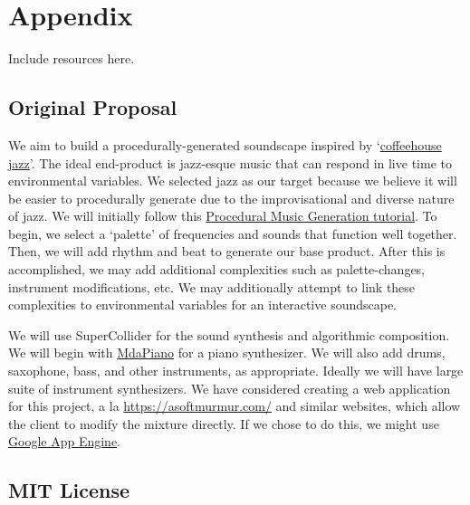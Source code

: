 \documentclass[12pt,a4paper]{article}
\begin{document}
\section{Appendix}
Include resources here.

\subsection{Original Proposal}
We aim to build a procedurally-generated soundscape inspired by `\href{https://www.youtube.com/watch?v=K2Q6YO3Ez44}{coffeehouse jazz}'. The ideal end-product is jazz-esque music that can respond in live time to environmental variables. We selected jazz as our target because we believe it will be easier to procedurally generate due to the improvisational and diverse nature of jazz. We will initially follow this \href{http://www.procjam.com/tutorials/en/music/}{Procedural Music Generation tutorial}. To begin, we select a `palette' of frequencies and sounds that function well together. Then, we will add rhythm and beat to generate our base product. After this is accomplished, we may add additional complexities such as palette-changes, instrument modifications, etc. We may additionally attempt to link these complexities to environmental variables for an interactive soundscape.

We will use SuperCollider for the sound synthesis and algorithmic composition. We will begin with \href{http://doc.sccode.org/Classes/MdaPiano.html}{MdaPiano} for a piano synthesizer. We will also add drums, saxophone, bass, and other instruments, as appropriate. Ideally we will have large suite of instrument synthesizers. We have considered creating a web application for this project, a la \href{Soft Murmur}{https://asoftmurmur.com/} and similar websites, which allow the client to modify the mixture directly. If we chose to do this, we might use \href{https://console.cloud.google.com/projectselector/appengine}{Google App Engine}. 

\subsection{MIT License}
\end{document}

